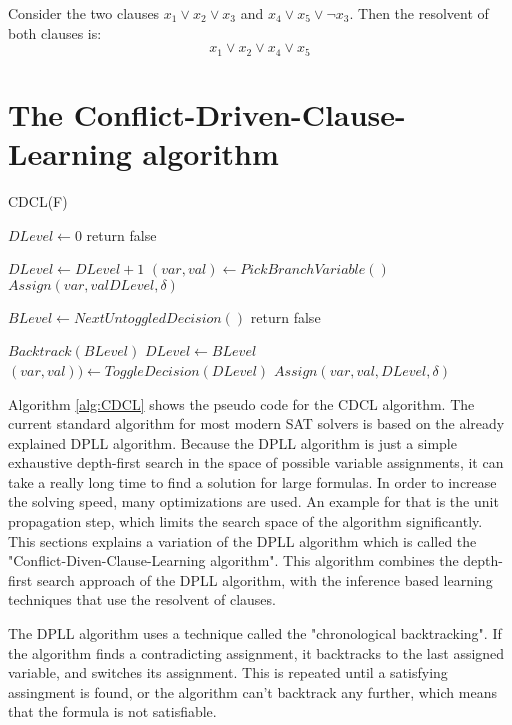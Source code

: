 \begin{leftbar}
Consider the two clauses $x_1 \vee x_2 \vee x_3$ and $x_4 \vee x_5 \vee \neg x_3$. Then the resolvent of both clauses is:
\begin{displaymath}
x_1 \vee x_2 \vee x_4 \vee x_5
\end{displaymath}
\end{leftbar}

\section{The Conflict-Driven-Clause-Learning algorithm}

\begin{algorithm}
\caption{CDCL(F) \cite{biere2009handbook}}\label{alg:CDCL}
\begin{algorithmic}
\State $DLevel \gets 0$
	\State return false
\EndIf

	\State $DLevel \gets DLevel + 1$
	\State $(var, val) \gets PickBranchVariable()$
	\State $Assign(var, val DLevel, \delta)$
	
		\State $BLevel \gets NextUntoggledDecision()$
			\State return false
		\EndIf
		
		\State $Backtrack(BLevel)$
		\State $DLevel \gets BLevel$
		\State $(var,val)) \gets ToggleDecision(DLevel)$
		\State $Assign(var, val, DLevel, \delta)$
	\EndWhile
\EndWhile
\end{algorithmic}
\end{algorithm}

Algorithm \ref{alg:CDCL} \cite{biere2009handbook} shows the pseudo code for the CDCL algorithm. The current standard algorithm for most modern SAT solvers is based on the already explained DPLL algorithm. Because the DPLL algorithm is just a simple exhaustive depth-first search in the space of possible variable assignments, it can take a really long time to find a solution for large formulas. In order to increase the solving speed, many optimizations are used. An example for that is the unit propagation step, which limits the search space of the algorithm significantly. This sections explains a variation of the DPLL algorithm which is called the "Conflict-Diven-Clause-Learning algorithm". This algorithm combines the depth-first search approach of the DPLL algorithm, with the inference based learning techniques that use the resolvent of clauses.

The DPLL algorithm uses a technique called the "chronological backtracking". If the algorithm finds a contradicting assignment, it backtracks to the last assigned variable, and switches its assignment. This is repeated until a satisfying assingment is found, or the algorithm can't backtrack any further, which means that the formula is not satisfiable.

